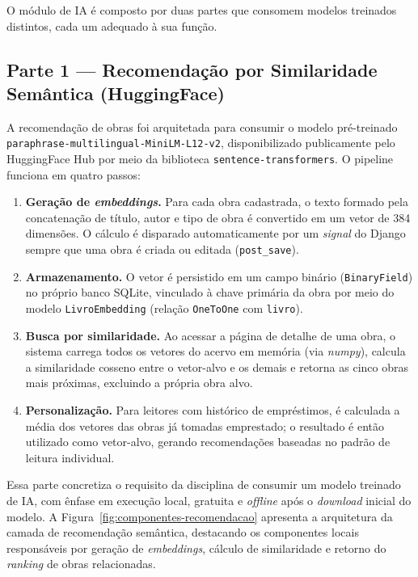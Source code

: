 \documentclass[monografia,abnt]{inf-ufg-modificado}
\begin{document}
O módulo de IA é composto por duas partes que consomem modelos treinados distintos, cada um adequado à sua função.

\subsection{Parte 1 --- Recomendação por Similaridade Semântica (HuggingFace)}

A recomendação de obras foi arquitetada para consumir o modelo pré-treinado \texttt{paraphrase-multilingual-MiniLM-L12-v2}, disponibilizado publicamente pelo HuggingFace Hub por meio da biblioteca \texttt{sentence-transformers}. O pipeline funciona em quatro passos:

\begin{enumerate}
    \item \textbf{Geração de \textit{embeddings}.} Para cada obra cadastrada, o texto formado pela concatenação de título, autor e tipo de obra é convertido em um vetor de 384 dimensões. O cálculo é disparado automaticamente por um \textit{signal} do Django sempre que uma obra é criada ou editada (\texttt{post\_save}).
    \item \textbf{Armazenamento.} O vetor é persistido em um campo binário (\texttt{BinaryField}) no próprio banco SQLite, vinculado à chave primária da obra por meio do modelo \texttt{LivroEmbedding} (relação \texttt{OneToOne} com \texttt{livro}).
    \item \textbf{Busca por similaridade.} Ao acessar a página de detalhe de uma obra, o sistema carrega todos os vetores do acervo em memória (via \textit{numpy}), calcula a similaridade cosseno entre o vetor-alvo e os demais e retorna as cinco obras mais próximas, excluindo a própria obra alvo.
    \item \textbf{Personalização.} Para leitores com histórico de empréstimos, é calculada a média dos vetores das obras já tomadas emprestado; o resultado é então utilizado como vetor-alvo, gerando recomendações baseadas no padrão de leitura individual.
\end{enumerate}

Essa parte concretiza o requisito da disciplina de consumir um modelo treinado de IA, com ênfase em execução local, gratuita e \textit{offline} após o \textit{download} inicial do modelo. A Figura~\ref{fig:componentes-recomendacao} apresenta a arquitetura da camada de recomendação semântica, destacando os componentes locais responsáveis por geração de \textit{embeddings}, cálculo de similaridade e retorno do \textit{ranking} de obras relacionadas.
\end{document}
